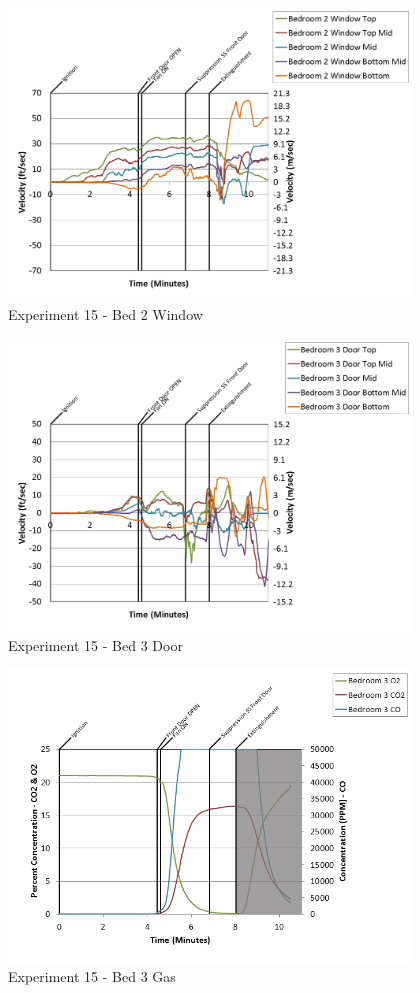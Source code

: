 \documentclass{article}
\begin{document}
\begin{appendices}
\clearpage

\begin{figure}[h!]
	\centering
	\includegraphics[height=3.05in]{0_Images/Results_Charts/Exp_15_Charts/Bed2Window.png}
	\caption{Experiment 15 - Bed 2 Window}
\end{figure}


\begin{figure}[h!]
	\centering
	\includegraphics[height=3.05in]{0_Images/Results_Charts/Exp_15_Charts/Bed3Door.png}
	\caption{Experiment 15 - Bed 3 Door}
\end{figure}

\clearpage

\begin{figure}[h!]
	\centering
	\includegraphics[height=3.05in]{0_Images/Results_Charts/Exp_15_Charts/Bed3Gas.png}
	\caption{Experiment 15 - Bed 3 Gas}
\end{figure}



\end{appendices}
\end{document}
